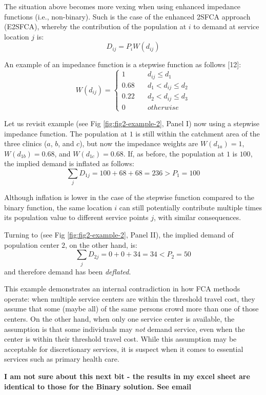 \documentclass[10pt,letterpaper]{article}
\begin{document}
The situation above becomes more vexing when using enhanced impedance
functions (i.e., non-binary). Such is the case of the enhanced 2SFCA
approach (E2SFCA), whereby the contribution of the population at \(i\)
to demand at service location \(j\) is: \[
D_{ij} = P_iW(d_{ij})
\]

An example of an impedance function is a stepwise function as follows
{[}12{]}: \[
W(d_{ij}) = \left\{
        \begin{array}{ll}
            1 & \quad d_{ij} \leq d_1 \\
            0.68 & \quad d_1 < d_{ij} \leq d_2 \\
            0.22 & \quad d_2 < d_{ij} \leq d_3 \\
            0 & \quad otherwise
        \end{array}
    \right.
\]

Let us revisit example (see Fig \ref{fig:fig2-example-2}, Panel I) now
using a stepwise impedance function. The population at \(1\) is still
within the catchment area of the three clinics (\(a\), \(b\), and
\(c\)), but now the impedance weights are \(W(d_{1a})=1\),
\(W(d_{1b})=0.68\), and \(W(d_{1c})=0.68\). If, as before, the
population at \(1\) is \(100\), the implied demand is inflated as
follows: \[
\sum_jD_{1j} = 100 + 68 + 68 = 236 > P_1 = 100
\]

Although inflation is lower in the case of the stepwise function
compared to the binary function, the same location \(i\) can still
potentially contribute multiple times its population value to different
service points \(j\), with similar consequences.

Turning to (see Fig \ref{fig:fig2-example-2}, Panel II), the implied
demand of population center \(2\), on the other hand, is: \[
\sum_jD_{2j} = 0 + 0 + 34 = 34 < P_2 = 50
\] and therefore demand has been \emph{deflated}.

This example demonstrates an internal contradiction in how FCA methods
operate: when multiple service centers are within the threshold travel
cost, they assume that some (maybe all) of the same persons crowd more
than one of those centers. On the other hand, when only one service
center is available, the assumption is that some individuals may
\emph{not} demand service, even when the center is within their
threshold travel cost. While this assumption may be acceptable for
discretionary services, it is suspect when it comes to essential
services such as primary health care.

\textbf{I am not sure about this next bit - the results in my excel
sheet are identical to those for the Binary solution. See email}
\end{document}
